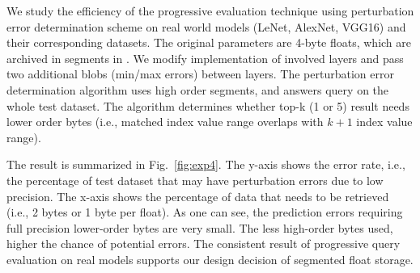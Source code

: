 \documentclass[conference]{IEEEtran}
\begin{document}



We study the efficiency of the progressive evaluation technique using perturbation error determination scheme on real world models (LeNet, AlexNet, VGG16) and their corresponding datasets. The original parameters are 4-byte floats, which are archived in segments in \weightstore. We modify  implementation of involved layers and pass two additional blobs (min/max errors) between layers. The perturbation error determination algorithm uses high order segments, and answers  query on the whole test dataset. The algorithm determines whether top-k (1 or 5) result needs lower order bytes (i.e., matched index value range overlaps with $k+1$ index value range). %

The result is summarized in Fig.~\ref{fig:exp4}. The y-axis shows the error rate, i.e., the percentage of test dataset that may have perturbation errors due to low precision. The x-axis shows the percentage of data that needs to be retrieved (i.e., 2 bytes or 1 byte per float). As one can see, the prediction errors requiring full precision lower-order bytes are very small. The less high-order bytes used, higher the chance of potential errors. The consistent result of progressive query evaluation on real models supports our design decision of segmented float storage. 

\end{document}
